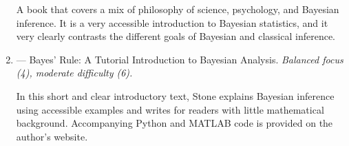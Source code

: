 \begin{enumerate}
A book that covers a mix of philosophy of science, psychology, and Bayesian inference. It is a very accessible introduction to Bayesian statistics, and it very clearly contrasts the different goals of Bayesian and classical inference. 

\item
\textbf{} --- Bayes' Rule: A Tutorial Introduction to Bayesian Analysis. \emph{Balanced focus (4), moderate difficulty (6).}

In this short and clear introductory text, Stone explains Bayesian inference using accessible examples and writes for readers with little mathematical background. Accompanying Python and MATLAB code is provided on the author's website.



\end{enumerate}
